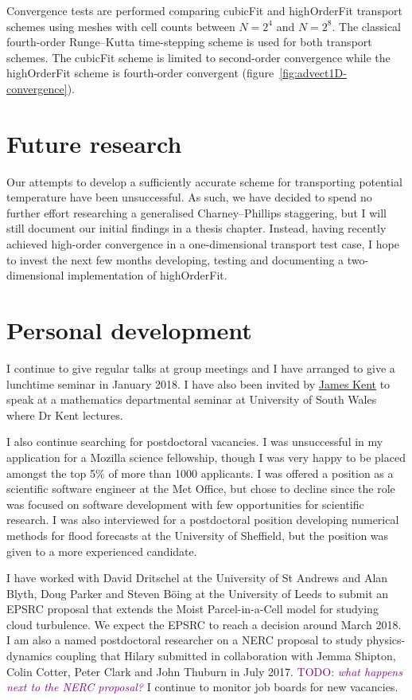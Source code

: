\documentclass[a4paper,11pt]{article}
\newcommand{\TODO}[1]{\textcolor{purple}{TODO: \emph{#1}}}
\begin{document}
Convergence tests are performed comparing cubicFit and highOrderFit transport schemes using meshes with cell counts between $N = 2^4$ and $N = 2^8$.  The classical fourth-order Runge--Kutta time-stepping scheme \citep[p. 53]{durran2013} is used for both transport schemes.  The cubicFit scheme is limited to second-order convergence while the highOrderFit scheme is fourth-order convergent (figure~\ref{fig:advect1D-convergence}).

\section{Future research}

Our attempts to develop a sufficiently accurate scheme for transporting potential temperature have been unsuccessful.
As such, we have decided to spend no further effort researching a generalised Charney--Phillips staggering, but I will still document our initial findings in a thesis chapter.
Instead, having recently achieved high-order convergence in a one-dimensional transport test case, I hope to invest the next few months developing, testing and documenting a two-dimensional implementation of highOrderFit.

\section{Personal development}

I continue to give regular talks at group meetings and I have arranged to give a lunchtime seminar in January 2018.
I have also been invited by \href{http://staff.southwales.ac.uk/users/8005-jkent}{James Kent} to speak at a mathematics departmental seminar at University of South Wales where Dr Kent lectures.

I also continue searching for postdoctoral vacancies.
I was unsuccessful in my application for a Mozilla science fellowship, though I was very happy to be placed amongst the top 5\% of more than 1000 applicants.
I was offered a position as a scientific software engineer at the Met Office, but chose to decline since the role was focused on software development with few opportunities for scientific research.
I was also interviewed for a postdoctoral position developing numerical methods for flood forecasts at the University of Sheffield, but the position was given to a more experienced candidate.

I have worked with David Dritschel at the University of St Andrews and Alan Blyth, Doug Parker and Steven B\"{o}ing at the University of Leeds to submit an EPSRC proposal that extends the Moist Parcel-in-a-Cell model \citep{boeing2017} for studying cloud turbulence.  We expect the EPSRC to reach a decision around March 2018.
I am also a named postdoctoral researcher on a NERC proposal to study physics-dynamics coupling that Hilary submitted in collaboration with Jemma Shipton, Colin Cotter, Peter Clark and John Thuburn in July 2017.
\TODO{what happens next to the NERC proposal?}
I continue to monitor job boards for new vacancies.
\end{document}
